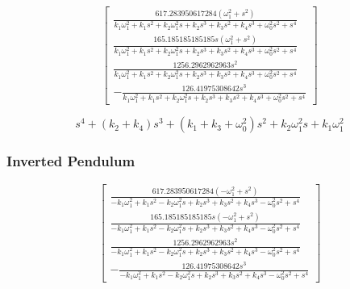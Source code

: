 \documentclass{article}
\begin{document}
\begin{equation}
  \left[\begin{matrix}\frac{617.283950617284 \left(\omega_{1}^{2} + s^{2}\right)}{k_{1} \omega_{1}^{2} + k_{1} s^{2} + k_{2} \omega_{1}^{2} s + k_{2} s^{3} + k_{3} s^{2} + k_{4} s^{3} + \omega_{0}^{2} s^{2} + s^{4}}\\\frac{165.185185185185 s \left(\omega_{1}^{2} + s^{2}\right)}{k_{1} \omega_{1}^{2} + k_{1} s^{2} + k_{2} \omega_{1}^{2} s + k_{2} s^{3} + k_{3} s^{2} + k_{4} s^{3} + \omega_{0}^{2} s^{2} + s^{4}}\\\frac{1256.2962962963 s^{2}}{k_{1} \omega_{1}^{2} + k_{1} s^{2} + k_{2} \omega_{1}^{2} s + k_{2} s^{3} + k_{3} s^{2} + k_{4} s^{3} + \omega_{0}^{2} s^{2} + s^{4}}\\- \frac{126.41975308642 s^{3}}{k_{1} \omega_{1}^{2} + k_{1} s^{2} + k_{2} \omega_{1}^{2} s + k_{2} s^{3} + k_{3} s^{2} + k_{4} s^{3} + \omega_{0}^{2} s^{2} + s^{4}}\end{matrix}\right]
\end{equation}

\begin{equation}
  s^{4} + \left(k_{2} + k_{4}\right) s^{3} + \left(k_{1} + k_{3} + \omega_{0}^{2}\right) s^{2} + k_{2} \omega_{1}^{2} s + k_{1} \omega_{1}^{2}
\end{equation}

\subsubsection{Inverted Pendulum}

\begin{equation}
  \left[\begin{matrix}\frac{617.283950617284 \left(- \omega_{1}^{2} + s^{2}\right)}{- k_{1} \omega_{1}^{2} + k_{1} s^{2} - k_{2} \omega_{1}^{2} s + k_{2} s^{3} + k_{3} s^{2} + k_{4} s^{3} - \omega_{0}^{2} s^{2} + s^{4}}\\\frac{165.185185185185 s \left(- \omega_{1}^{2} + s^{2}\right)}{- k_{1} \omega_{1}^{2} + k_{1} s^{2} - k_{2} \omega_{1}^{2} s + k_{2} s^{3} + k_{3} s^{2} + k_{4} s^{3} - \omega_{0}^{2} s^{2} + s^{4}}\\\frac{1256.2962962963 s^{2}}{- k_{1} \omega_{1}^{2} + k_{1} s^{2} - k_{2} \omega_{1}^{2} s + k_{2} s^{3} + k_{3} s^{2} + k_{4} s^{3} - \omega_{0}^{2} s^{2} + s^{4}}\\- \frac{126.41975308642 s^{3}}{- k_{1} \omega_{1}^{2} + k_{1} s^{2} - k_{2} \omega_{1}^{2} s + k_{2} s^{3} + k_{3} s^{2} + k_{4} s^{3} - \omega_{0}^{2} s^{2} + s^{4}}\end{matrix}\right]
\end{equation}
\end{document}
